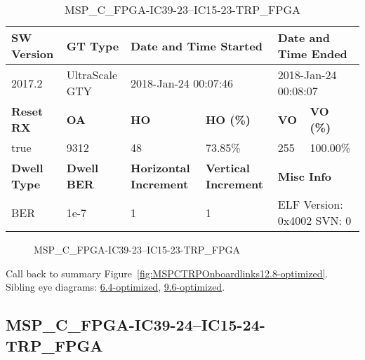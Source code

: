 \begin{table}[h]
\centering
\caption{MSP\_C\_FPGA-IC39-23--IC15-23-TRP\_FPGA}
\label{tab:MSPCFPGAIC3923IC1523TRPFPGA12.8-optimized}
\begin{tabular}{@{}|l|l|l|l|l|l|@{}}
\toprule
\textbf{SW Version}                & \textbf{GT Type}   & \multicolumn{2}{l|}{\textbf{Date and Time Started}}            & \multicolumn{2}{l|}{\textbf{Date and Time Ended}}        \\ \midrule
2017.2                       & UltraScale GTY          & \multicolumn{2}{l|}{2018-Jan-24 00:07:46}                   & \multicolumn{2}{l|}{2018-Jan-24 00:08:07}               \\ \midrule
\textbf{Reset RX}                  & \textbf{OA} & \textbf{HO}   & \textbf{HO (\%)} & \textbf{VO} & \textbf{VO (\%)} \\ \midrule
true & 9312        & 48          & 73.85\%        & 255        & 100.00\%       \\ \midrule
\textbf{Dwell Type}                & \textbf{Dwell BER} & \textbf{Horizontal Increment} & \textbf{Vertical Increment}    & \multicolumn{2}{l|}{\textbf{Misc Info}}                  \\ \midrule
BER                            & 1e-7        & 1        & 1           & \multicolumn{2}{l|}{ELF Version: 0x4002 SVN: 0}                         \\ \bottomrule
\end{tabular}
\end{table}

\begin{figure}[h]
\caption{MSP\_C\_FPGA-IC39-23--IC15-23-TRP\_FPGA} \label{fig:MSPCFPGAIC3923IC1523TRPFPGA12.8-optimized}
\end{figure}

Call back to summary Figure~\ref{fig:MSPCTRPOnboardlinks12.8-optimized}.
Sibling eye diagrams: \hyperref[sec:MSPCFPGAIC3923IC1523TRPFPGA6.4-optimized]{6.4-optimized}, \hyperref[sec:MSPCFPGAIC3923IC1523TRPFPGA9.6-optimized]{9.6-optimized}.

\clearpage
\newpage


\subsection{MSP\_C\_FPGA-IC39-24--IC15-24-TRP\_FPGA}\label{sec:MSPCFPGAIC3924IC1524TRPFPGA12.8-optimized}

